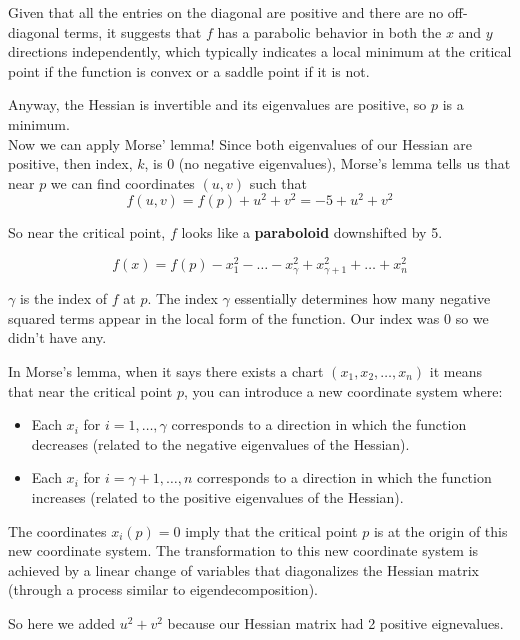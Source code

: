 Given that all the entries on the diagonal are positive and there are no off-diagonal terms, it suggests that 
$f$ has a parabolic behavior in both the $x$ and $y$ directions independently,
which typically indicates a local minimum at the critical point if the function is convex or a saddle point if it is not. 

Anyway, the Hessian is invertible and its eigenvalues are positive, so $p$ is a minimum.
\\

Now we can apply Morse' lemma!
Since both eigenvalues of our Hessian are positive, then index, $k$, is 0 (no negative eigenvalues),
Morse's lemma tells us that near $p$ we can find coordinates $(u, v)$ such that
$$
f(u, v) = f(p) + u^2 + v^2 = -5 + u^2 +v^2
$$

So near the critical point, $f$ looks like a \textbf{paraboloid} downshifted by 5.

$$
f(x) = f(p) - x_{1}^{2} - \ldots - x_{\gamma}^{2} + x_{\gamma +1}^{2} + \ldots + x_{n}^{2}
$$

$\gamma$ is the index of $f$ at $p$.
The index $\gamma$ essentially determines how many negative squared terms appear in the local form of the function.
Our index was 0 so we didn't have any.

In Morse's lemma, when it says there exists a chart $(x_1, x_2, \ldots , x_n)$
it means that near the critical point $p$, you can introduce a new coordinate system where:

\begin{itemize}
    \item Each $x_i$ for $i = 1, \ldots , \gamma$ corresponds to a direction in which the function decreases
        (related to the negative eigenvalues of the Hessian).
    \item Each $x_i$ for $i = \gamma +1, \ldots, n$ corresponds to a direction in which the function increases
        (related to the positive eigenvalues of the Hessian).
\end{itemize}

The coordinates $x_i (p) = 0$ imply that the critical point $p$ is at the origin of this new coordinate system.
The transformation to this new coordinate system is achieved by a linear change of variables that diagonalizes
the Hessian matrix (through a process similar to eigendecomposition).

So here we added $u^2 + v^2$ because our Hessian matrix had 2 positive eignevalues.

